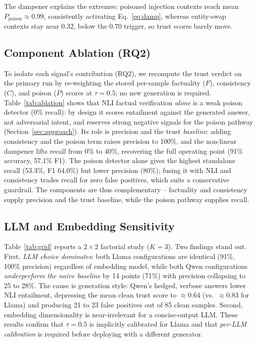 
The dampener explains the extremes: poisoned injection contexts reach mean $P_{\text{poison}}\approx0.99$, consistently activating Eq.~\ref{eq:damp}, whereas entity-swap contexts stay near $0.32$, below the $0.70$ trigger, so trust scores barely move.


\subsection{Component Ablation (RQ2)}
\label{sec:ablation}
To isolate each signal's contribution (RQ2), we recompute the trust verdict on the primary run by re-weighting the stored per-sample factuality ($F$), consistency ($C$), and poison ($P$) scores at $\tau{=}0.5$; no new generation is required. Table~\ref{tab:ablation} shows that NLI factual verification \emph{alone} is a weak poison detector (0\% recall): by design it scores entailment against the generated answer, not adversarial intent, and reserves strong negative signals for the poison pathway (Section~\ref{sec:approach}). Its role is precision and the trust \emph{baseline}: adding consistency and the poison term raises precision to 100\%, and the non-linear dampener lifts recall from 0\% to 40\%, recovering the full operating point (91\% accuracy, 57.1\% F1). The poison detector alone gives the highest standalone recall (53.3\%, F1 64.0\%) but lower precision (80\%); fusing it with NLI and consistency trades recall for zero false positives, which suits a conservative guardrail. The components are thus complementary -- factuality and consistency supply precision and the trust baseline, while the poison pathway supplies recall.


\subsection{LLM and Embedding Sensitivity}
\label{sec:grid}
Table~\ref{tab:grid} reports a $2\times2$ factorial study ($K{=}3$). Two findings stand out. First, \emph{LLM choice dominates}: both Llama configurations are identical (91\%, 100\% precision) regardless of embedding model, while both Qwen configurations \emph{underperform the naive baseline} by 14 points (71\%) with precision collapsing to 25 to 28\%. The cause is generation style: Qwen's hedged, verbose answers lower NLI entailment, depressing the mean clean trust score to $\approx$0.64 (vs.\ $\approx$0.83 for Llama) and producing 21 to 23 false positives out of 85 clean samples. Second, embedding dimensionality is near-irrelevant for a concise-output LLM. These results confirm that $\tau{=}0.5$ is implicitly calibrated for Llama and that \emph{per-LLM calibration} is required before deploying with a different generator.


